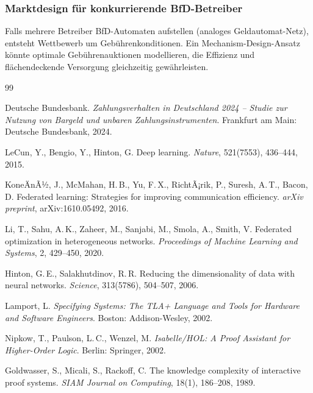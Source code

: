 ﻿\documentclass[a4paper,12pt]{article}
\theoremstyle{definition}
\begin{document}
\subsubsection{Marktdesign für konkurrierende BfD-Betreiber}

Falls mehrere Betreiber BfD-Automaten aufstellen (analoges Geldautomat-Netz),
entsteht Wettbewerb um Gebührenkonditionen.  Ein Mechanism-Design-Ansatz \cite{myerson1979}
könnte optimale Gebührenauktionen modellieren, die Effizienz und
flächendeckende Versorgung gleichzeitig gewährleisten.

\begin{thebibliography}{99}

  Deutsche Bundesbank.
  \emph{Zahlungsverhalten in Deutschland 2024 -- Studie zur Nutzung von Bargeld und
  unbaren Zahlungsinstrumenten}.
  Frankfurt am Main: Deutsche Bundesbank, 2024.

  LeCun, Y., Bengio, Y., Hinton, G.
  Deep learning.
  \emph{Nature}, 521(7553), 436--444, 2015.

  KoneÄnÃ½, J., McMahan, H.\,B., Yu, F.\,X., RichtÃ¡rik, P., Suresh, A.\,T.,
  Bacon, D.
  Federated learning: Strategies for improving communication efficiency.
  \emph{arXiv preprint}, arXiv:1610.05492, 2016.

  Li, T., Sahu, A.\,K., Zaheer, M., Sanjabi, M., Smola, A., Smith, V.
  Federated optimization in heterogeneous networks.
  \emph{Proceedings of Machine Learning and Systems}, 2, 429--450, 2020.

  Hinton, G.\,E., Salakhutdinov, R.\,R.
  Reducing the dimensionality of data with neural networks.
  \emph{Science}, 313(5786), 504--507, 2006.

  Lamport, L.
  \emph{Specifying Systems: The TLA+ Language and Tools for Hardware and
  Software Engineers}.
  Boston: Addison-Wesley, 2002.

  Nipkow, T., Paulson, L.\,C., Wenzel, M.
  \emph{Isabelle/HOL: A Proof Assistant for Higher-Order Logic}.
  Berlin: Springer, 2002.

  Goldwasser, S., Micali, S., Rackoff, C.
  The knowledge complexity of interactive proof systems.
  \emph{SIAM Journal on Computing}, 18(1), 186--208, 1989.


\end{thebibliography}
\end{document}
